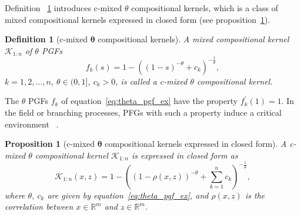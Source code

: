 \documentclass[final, 12pt]{colt2021} %
\newtheorem{dfn}{Definition}
\newtheorem{prop}{Proposition}
\begin{document}



Definition ~\ref{dfn:cmixed_k}
introduces c-mixed $\theta$ compositional kernels,
which is a class of mixed compositional kernels
expressed in closed form
(see proposition~\ref{prop:ex_critical_theta_kernel}).

\begin{dfn}[c-mixed $\boldsymbol{\theta}$ compositional kernels]
\label{dfn:cmixed_k}
A mixed compositional kernel $\mathcal{K}_{1:n}$ of
$\theta$ PGFs
\begin{equation}
\label{eq:theta_pgf_ex}
f_k (s) =
1 - ((1 - s)^{-\theta} + c_k)^{-\frac{1}{\theta}},
\end{equation}
$k=1,2,\dots,n$, $\theta \in (0, 1]$, $c_k > 0$,
is called a c-mixed $\theta$ compositional kernel.
\end{dfn}

The $\theta$ PGFs $f_{k}$ of
equation~\eqref{eq:theta_pgf_ex}
have the property $f_{k}^{\prime}(1)=1$.
In the field or branching processes,
PFGs with such a property induce a critical environment
~\citep[section 5]{alsmeyer2021}.


\begin{prop}[c-mixed $\boldsymbol{\theta}$ compositional kernels expressed in closed form]
\label{prop:ex_critical_theta_kernel}
A c-mixed $\theta$ compositional kernel $\mathcal{K}_{1:n}$
is expressed in closed form as
\begin{equation}
\label{eq:theta_k_ex}
\mathcal{K}_{1:n}(x, z) =
1 - \left(
(1-\rho (x, z))^{-\theta}
+ \sum_{k = 1}^{n} c_k
\right)^{-\frac{1}{\theta}},
\end{equation}
where
$\theta,~c_{k}$ are given by equation~\eqref{eq:theta_pgf_ex}, and
$\rho (x, z)$ is the correlation between
$x\in\mathbb{R}^m$ and $z\in\mathbb{R}^m$.
\end{prop}
\end{document}

